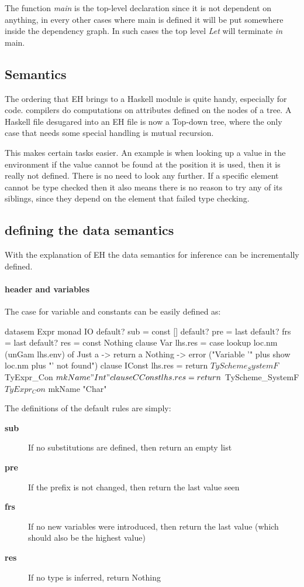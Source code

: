 The function \emph{main} is the top-level declaration since it is not dependent on anything, in every other cases where main is defined it will be put somewhere inside the dependency graph. In such cases the top level \emph{Let} will terminate \emph{in} main.
\subsection{Semantics}

The ordering that EH brings to a Haskell module is quite handy, especially for \ag code. \ag compilers do computations on attributes defined on the nodes of a tree. A Haskell file desugared into an EH file is now a Top-down tree, where the only case that needs some special handling is mutual recursion. 

This makes certain tasks easier. An example is when looking up a value in the environment if the value cannot be found at the position it is used, then it is really not defined. There is no need to look any further. If a specific element cannot be type checked then it also means there is no reason to try any of its siblings, since they depend on the element that failed type checking.

\subsection{defining the data semantics}
With the explanation of EH the data semantics for inference can be incrementally defined.

\paragraph{header and variables}
The case for variable and constants can be easily defined as:
\begin{code}
datasem Expr monad IO
    default? sub = const []
    default? pre = last
    default? frs = last
    default? res = const Nothing
    clause Var
        lhs.res =
          case lookup loc.nm (unGam lhs.env) of
           Just a  -> return a
           Nothing -> error ("Variable '" plus show loc.nm plus "' not found")
    clause IConst
       lhs.res = return $ TyScheme_SystemF $ TyExpr_Con $ mkName "Int"
    clause CConst
       lhs.res = return $ TyScheme_SystemF $ TyExpr_Con $ mkName "Char"
\end{code}

The definitions of the default rules are simply:
\begin{description}
\item[\textbf{sub}] If no substitutions are defined, then return an empty list
\item[\textbf{pre}] If the prefix is not changed, then return the last value seen
\item[\textbf{frs}] If no new variables were introduced, then return the last value (which should also be the highest value)
\item[\textbf{res}] If no type is inferred, return Nothing
\end{description}

